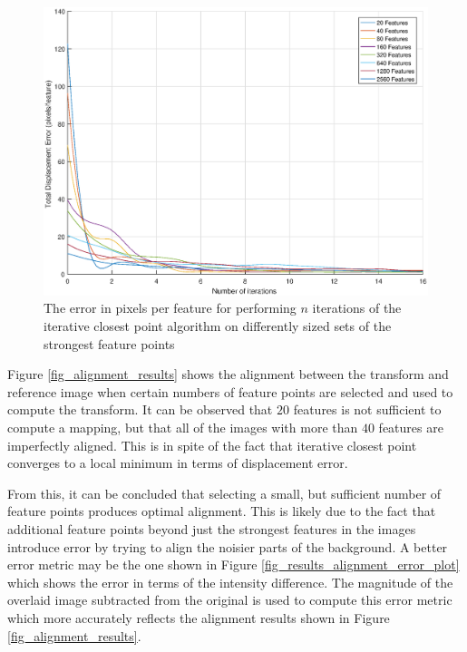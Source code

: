 \documentclass[sigconf]{acmart/acmart}
\begin{document}
\begin{figure}[h]
	\centering
	\includegraphics[width=\textwidth]{figures/alignment/error_for_iterations}
	\caption{The error in pixels per feature for performing $n$ iterations of the iterative closest point algorithm on differently sized sets of the strongest feature points}
	\label{fig_results_error_plot}
\end{figure}

Figure \ref{fig_alignment_results} shows the alignment between the transform and reference image when certain numbers of feature points are selected and used to compute the transform. It can be observed that $20$ features is not sufficient to compute a mapping, but that all of the images with more than $40$ features are imperfectly aligned. This is in spite of the fact that iterative closest point converges to a local minimum in terms of displacement error.

From this, it can be concluded that selecting a small, but sufficient number of feature points produces optimal alignment. This is likely due to the fact that additional feature points beyond just the strongest features in the images introduce error by trying to align the noisier parts of the background. A better error metric may be the one shown in Figure \ref{fig_results_alignment_error_plot} which shows the error in terms of the intensity difference. The magnitude of the overlaid image subtracted from the original is used to compute this error metric which more accurately reflects the alignment results shown in Figure \ref{fig_alignment_results}.
\end{document}
